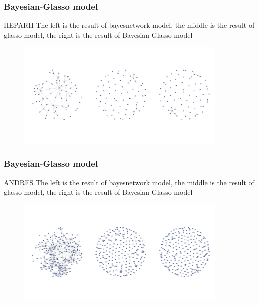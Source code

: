 \documentclass{beamer}
\begin{document}
\begin{frame}
\frametitle{Bayesian-Glasso model}
  \begin{block}{HEPARII}
  The left is the result of bayesnetwork model, the middle is the result of glasso model, the right is the result of Bayesian-Glasso model
 \begin{center}
 \begin{figure}
     \includegraphics[width=0.9\textwidth, height=0.7\textheight]{hepar2.jpeg}

    \end{figure}
\end{center}
  \end{block}


\end{frame}
\begin{frame}
\frametitle{Bayesian-Glasso model}
  \begin{block}{ANDRES}
  The left is the result of bayesnetwork model, the middle is the result of glasso model, the right is the result of Bayesian-Glasso model
 \begin{center}
 \begin{figure}
     \includegraphics[width=0.9\textwidth, height=0.7\textheight]{andres.jpeg}

    \end{figure}
\end{center}
  \end{block}


\end{frame}
\end{document}
